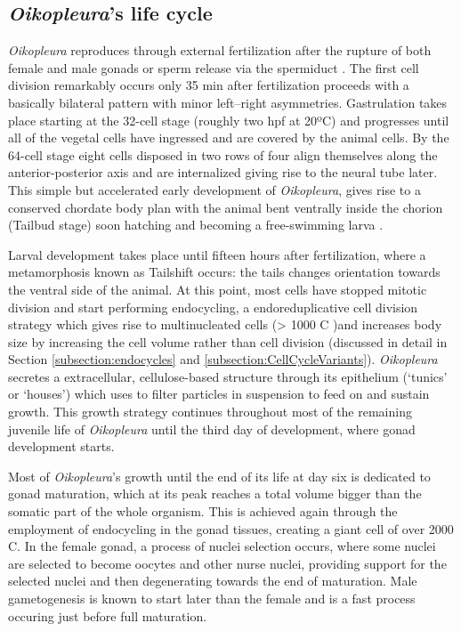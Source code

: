 \documentclass[11pt,twoside,a4paper]{report}
\begin{document}
		\subsection{\textit{Oikopleura}'s life cycle}
		\label{subsection:lifeCycle}
		\textit{Oikopleura} reproduces through external fertilization after the rupture of both female and male gonads or sperm release via the spermiduct \cite{Bouquet2009}. The first cell division remarkably occurs only 35 min after fertilization proceeds with a basically bilateral pattern with minor left–right asymmetries. Gastrulation takes place starting at the 32-cell stage (roughly two hpf at 20ºC) and progresses until all of the vegetal cells have ingressed and are covered by the animal cells. By the 64-cell stage eight cells disposed in two rows of four align themselves along the anterior-posterior axis and are internalized giving rise to the neural tube later. This simple but accelerated early development of \textit{Oikopleura}, gives rise to a conserved chordate body plan with the animal bent ventrally inside the chorion (Tailbud stage) soon hatching and becoming a free-swimming larva \cite{Fujii2008}.
		
		Larval development takes place until fifteen hours after fertilization, where a metamorphosis known as Tailshift occurs: the tails changes orientation towards the ventral side of the animal. At this point, most cells have stopped mitotic division and start performing endocycling, a endoreduplicative cell division strategy which gives rise to multinucleated cells (> 1000 C \cite{Ganot2002})and increases body size by increasing the cell volume rather than cell division (discussed in detail in Section \ref{subsection:endocycles} and \ref{subsection:CellCycleVariants}). \textit{Oikopleura} secretes a extracellular, cellulose-based structure through its epithelium (‘tunics’ or ‘houses’) which uses to filter particles in suspension to feed on and sustain growth. This growth strategy continues throughout most of the remaining juvenile life of \textit{Oikopleura} until the third day of development, where gonad development starts.
		
		Most of \textit{Oikopleura}'s growth until the end of its life at day six is dedicated to gonad maturation, which at its peak reaches a total volume bigger than the somatic part of the whole organism. This is achieved again through the employment of endocycling in the gonad tissues, creating a giant cell of over 2000 C. In the female gonad, a process of nuclei selection occurs, where some nuclei are selected to become oocytes and other nurse nuclei, providing support for the selected nuclei and then degenerating towards the end of maturation. Male gametogenesis is known to start later than the female and is a fast process occuring just before full maturation.
		
\end{document}
